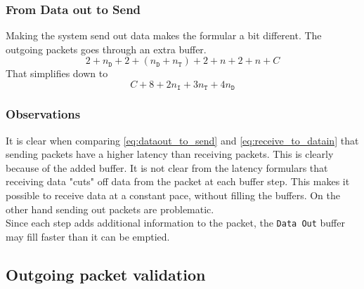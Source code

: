 \subsubsection{From Data out to Send}
Making the system send out data makes the formular a bit different. The outgoing
packets goes through an extra buffer.
\begin{equation*}
   2 + n_{\mathtt{D}} + 2 + (n_{\mathtt{D}} + n_{\mathtt{T}}) + 2 + n + 2 + n + C
\end{equation*}
That simplifies down to
\begin{equation} \label{eq:dataout_to_send}
    C + 8 + 2n_{\mathtt{I}} + 3n_{\mathtt{T}} + 4n_{\mathtt{D}}
\end{equation}

\subsubsection{Observations}
It is clear when comparing \autoref{eq:dataout_to_send} and
\autoref{eq:receive_to_datain} that sending packets have a higher latency than
receiving packets. This is clearly because of the added buffer. It is not clear
from the latency formulars that receiving data "cuts" off data from the packet
at each buffer step. This makes it possible to receive data at a constant pace,
without filling the buffers. On the other hand sending out packets are
problematic. \\
Since each step adds additional information to the packet, the \texttt{Data Out}
buffer may fill faster than it can be emptied.


\subsection{Outgoing packet validation}

